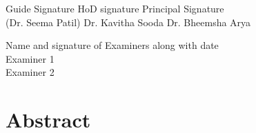 \documentclass[12pt,a4paper]{report}
\begin{document}
\vspace{2cm}
\begin{flushleft}
Guide Signature\hspace{30mm} HoD signature \hspace{25mm} Principal Signature\\
(Dr. Seema Patil) \hspace{25mm} Dr. Kavitha Sooda \hspace{19mm} Dr. Bheemsha Arya
\end{flushleft}
\vspace{2cm}
\begin{flushleft}
Name and signature of Examiners along with date \\
\vspace {1cm}
Examiner 1 \\
\vspace {1cm}
Examiner 2 \\

\end{flushleft}



\chapter*{Abstract}
\thispagestyle{empty}

\end{document}
